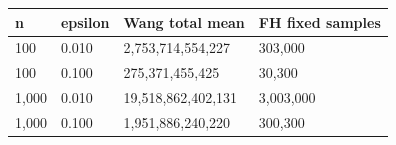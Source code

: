 \begin{tabular}{llll}
\toprule
n & epsilon & Wang total mean & FH fixed samples \\
\midrule
100 & 0.010 & 2,753,714,554,227 & 303,000 \\
100 & 0.100 & 275,371,455,425 & 30,300 \\
1,000 & 0.010 & 19,518,862,402,131 & 3,003,000 \\
1,000 & 0.100 & 1,951,886,240,220 & 300,300 \\
\bottomrule
\end{tabular}
